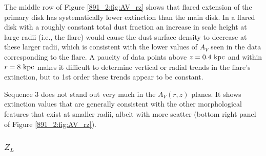 The middle row of Figure \ref{891_2:fig:AV_rz} shows that flared extension
of the primary disk has systematically lower extinction than the main
disk. In a flared disk with a roughly constant total dust fraction an
increase in scale height at large radii (i.e., the flare) would cause
the dust surface density to decrease at these larger radii, which is
consistent with the lower values of $A_V$ seen in the data
corresponding to the flare. A paucity of data points above $z =
0.4~\mathrm{kpc} $ and within $r = 8~\mathrm{kpc} $ makes it difficult to
determine vertical or radial trends in the flare's extinction, but to
1st order these trends appear to be constant.


Sequence 3 does not stand out very much in the $A_V(r,z)$ planes. It
shows extinction values that are generally consistent with the other
morphological features that exist at smaller radii, albeit with more
scatter (bottom right panel of Figure \ref{891_2:fig:AV_rz}).


\subsubsection{$Z_L$}


